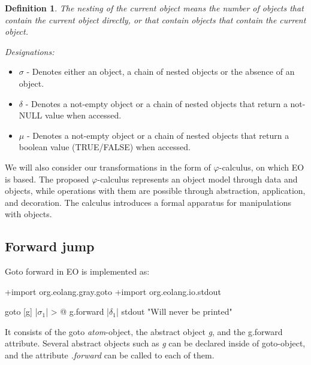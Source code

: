 \documentclass[sigplan,review,11pt,nonacm,natbib=false]{acmart}
\newtheorem{definition}{Definition}[section]
\begin{document}
\begin{definition} The \emph{nesting} of the current object means the number of objects that contain the current object directly, or that contain objects that contain the current object.
\end{definition}

\emph{Designations:}

\begin{itemize}
\item $\sigma$ - Denotes either an object, a chain of nested objects or the absence of an object.

\item $\delta$ - Denotes a not-empty object or a chain of nested objects that return a not-NULL value when accessed.

\item $\mu$ - Denotes a not-empty object or a chain of nested objects that return a boolean value (TRUE/FALSE) when accessed.
\end{itemize}

\newcommand\sgm[1]{$\sigma_#1$}
\newcommand\dlt[1]{$\delta_#1$}
\newcommand\m[1]{$\mu_#1$}

We will also consider our transformations in the form of $\varphi$-calculus, on which EO is based. The proposed $\varphi$-calculus represents an object model through data and objects, while operations with them are possible through abstraction, application, and decoration.
The calculus introduces a formal apparatus for manipulations with objects.



\subsection{Forward jump}
Goto forward in EO is implemented as:

\begin{ffcode}
+import org.eolang.gray.goto
+import org.eolang.io.stdout

goto
  [g]
    |\sgm{1}| > @
      g.forward |\dlt{1}|
      stdout "Will never be printed"
\end{ffcode}

It consists of the goto \emph{atom}-object, the abstract object \emph{g}, and the g.forward attribute. Several abstract objects such as \emph{g} can be declared inside of goto-object, and the attribute \emph{.forward} can be called to each of them.
\end{document}
